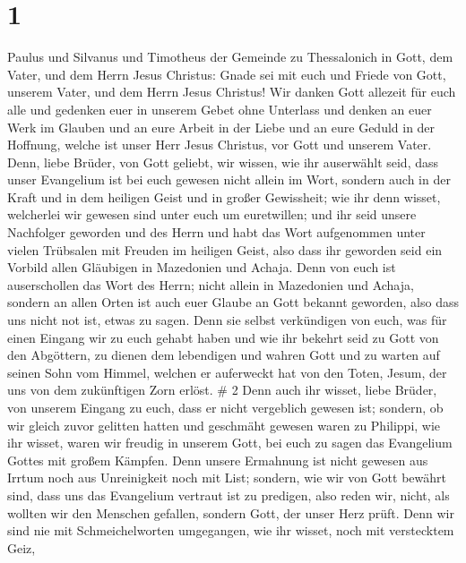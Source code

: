 \hypertarget{section}{%
\section{1}\label{section}}

 Paulus und Silvanus und Timotheus der Gemeinde zu
Thessalonich in Gott, dem Vater, und dem Herrn Jesus Christus: Gnade sei
mit euch und Friede von Gott, unserem Vater, und dem Herrn Jesus
Christus!  Wir danken Gott allezeit für euch alle und
gedenken euer in unserem Gebet ohne Unterlass  und denken an
euer Werk im Glauben und an eure Arbeit in der Liebe und an eure Geduld
in der Hoffnung, welche ist unser Herr Jesus Christus, vor Gott und
unserem Vater.  Denn, liebe Brüder, von Gott geliebt, wir
wissen, wie ihr auserwählt seid,  dass unser Evangelium ist
bei euch gewesen nicht allein im Wort, sondern auch in der Kraft und in
dem heiligen Geist und in großer Gewissheit; wie ihr denn wisset,
welcherlei wir gewesen sind unter euch um euretwillen;  und
ihr seid unsere Nachfolger geworden und des Herrn und habt das Wort
aufgenommen unter vielen Trübsalen mit Freuden im heiligen Geist,
 also dass ihr geworden seid ein Vorbild allen Gläubigen in
Mazedonien und Achaja.  Denn von euch ist auserschollen das
Wort des Herrn; nicht allein in Mazedonien und Achaja, sondern an allen
Orten ist auch euer Glaube an Gott bekannt geworden, also dass uns nicht
not ist, etwas zu sagen.  Denn sie selbst verkündigen von
euch, was für einen Eingang wir zu euch gehabt haben und wie ihr bekehrt
seid zu Gott von den Abgöttern, zu dienen dem lebendigen und wahren Gott
 und zu warten auf seinen Sohn vom Himmel, welchen er
auferweckt hat von den Toten, Jesum, der uns von dem zukünftigen Zorn
erlöst. \# 2  Denn auch ihr wisset, liebe Brüder, von
unserem Eingang zu euch, dass er nicht vergeblich gewesen ist;
 sondern, ob wir gleich zuvor gelitten hatten und geschmäht
gewesen waren zu Philippi, wie ihr wisset, waren wir freudig in unserem
Gott, bei euch zu sagen das Evangelium Gottes mit großem Kämpfen.
 Denn unsere Ermahnung ist nicht gewesen aus Irrtum noch aus
Unreinigkeit noch mit List;  sondern, wie wir von Gott
bewährt sind, dass uns das Evangelium vertraut ist zu predigen, also
reden wir, nicht, als wollten wir den Menschen gefallen, sondern Gott,
der unser Herz prüft.  Denn wir sind nie mit
Schmeichelworten umgegangen, wie ihr wisset, noch mit verstecktem Geiz,
